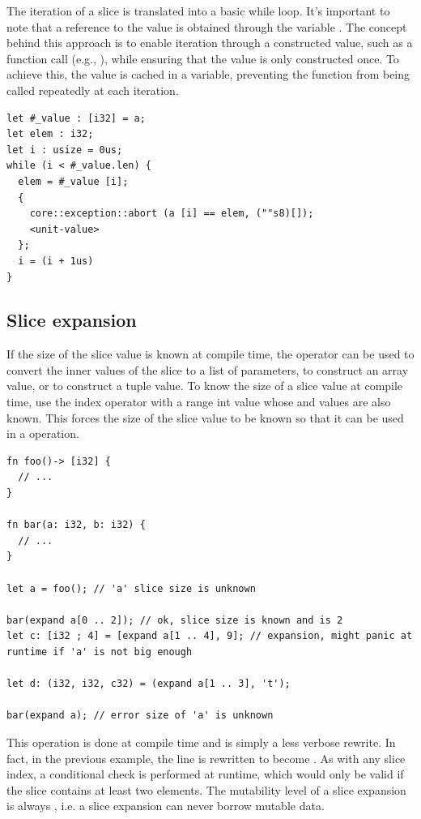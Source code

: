 The iteration of a slice is translated into a basic while loop. It's important
to note that a reference to the value is obtained through the variable
. The concept behind this approach is to enable iteration
through a constructed value, such as a function call (e.g., ), while ensuring that the value is only constructed once. To achieve
this, the value is cached in a variable, preventing the function from being
called repeatedly at each iteration.

\begin{lstlisting}[style=myilVerb]
let #_value : [i32] = a;
let elem : i32;
let i : usize = 0us;
while (i < #_value.len) {
  elem = #_value [i];
  {
    core::exception::abort (a [i] == elem, (""s8)[]);
    <unit-value>
  };
  i = (i + 1us)
}
\end{lstlisting}

\subsection{Slice expansion}
\label{sec:slice_expansion}

If the size of the slice value is known at compile time, the 
operator can be used to convert the inner values of the slice to a list of
parameters, to construct an array value, or to construct a tuple value. To know
the size of a slice value at compile time, use the index operator with a range
int value whose  and  values are also known. This forces
the size of the slice value to be known so that it can be used in a
 operation.

\begin{lstlisting}[style=coloredverbatimError]
fn foo()-> [i32] {
  // ...
}

fn bar(a: i32, b: i32) {
  // ...
}

let a = foo(); // 'a' slice size is unknown

bar(expand a[0 .. 2]); // ok, slice size is known and is 2
let c: [i32 ; 4] = [expand a[1 .. 4], 9]; // expansion, might panic at runtime if 'a' is not big enough

let d: (i32, i32, c32) = (expand a[1 .. 3], 't');

bar(expand a); // error size of 'a' is unknown
  \end{lstlisting}

This operation is done at compile time and is simply a less verbose rewrite. In
fact, in the previous example, the line  is
rewritten to become . As with any slice index, a
conditional check is performed at runtime, which would only be valid if the
slice  contains at least two elements. The mutability level of a slice
expansion is always , i.e. a slice expansion can never borrow mutable
data.



